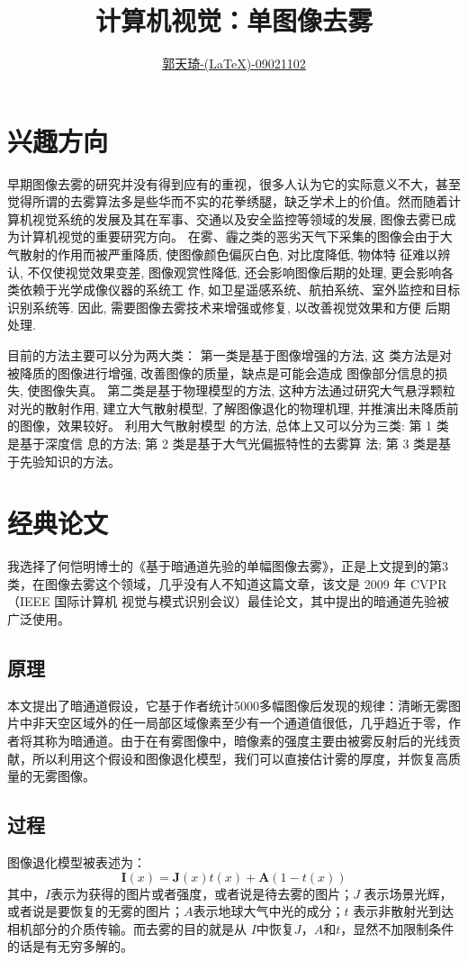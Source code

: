 \documentclass[conference]{IEEEtran}
\title{计算机视觉：单图像去雾}
\author{\underline{\underline{郭天琦-(\LaTeX{})-09021102}}}
\begin{document}
\maketitle
\section{兴趣方向}
早期图像去雾的研究并没有得到应有的重视，很多人认为它的实际意义不大，甚至觉得所谓的去雾算法多是些华而不实的花拳绣腿，缺乏学术上的价值。然而随着计算机视觉系统的发展及其在军事、交通以及安全监控等领域的发展, 图像去雾已成为计算机视觉的重要研究方向。 在雾、霾之类的恶劣天气下采集的图像会由于大气散射的作用而被严重降质, 使图像颜色偏灰白色, 对比度降低, 物体特
征难以辨认, 不仅使视觉效果变差, 图像观赏性降低, 还会影响图像后期的处理, 更会影响各类依赖于光学成像仪器的系统工
作, 如卫星遥感系统、航拍系统、室外监控和目标识别系统等. 因此, 需要图像去雾技术来增强或修复, 以改善视觉效果和方便
后期处理.\cite{吴迪2015图像去雾的最新研究进展}

目前的方法主要可以分为两大类：
第一类是基于图像增强的方法, 这
类方法是对被降质的图像进行增强, 改善图像的质量，缺点是可能会造成
图像部分信息的损失, 使图像失真。
第二类是基于物理模型的方法, 这种方法通过研究大气悬浮颗粒对光的散射作用, 建立大气散射模型, 了解图像退化的物理机理, 并推演出未降质前的图像，效果较好。
利用大气散射模型
的方法, 总体上又可以分为三类: 第 1 类是基于深度信
息的方法; 第 2 类是基于大气光偏振特性的去雾算
法; 第 3 类是基于先验知识的方法。
\section{经典论文}
我选择了何恺明博士的《基于暗通道先验的单幅图像去雾》，正是上文提到的第3类，在图像去雾这个领域，几乎没有人不知道这篇文章，该文是 2009 年 CVPR（IEEE 国际计算机
视觉与模式识别会议）最佳论文，其中提出的暗通道先验被广泛使用。
\subsection{原理}
本文提出了暗通道假设，它基于作者统计5000多幅图像后发现的规律：清晰无雾图片中非天空区域外的任一局部区域像素至少有一个通道值很低，几乎趋近于零，作者将其称为暗通道。由于在有雾图像中，暗像素的强度主要由被雾反射后的光线贡献，所以利用这个假设和图像退化模型，我们可以直接估计雾的厚度，并恢复高质量的无雾图像。
\subsection{过程}
图像退化模型被表述为：
\begin{equation}
    \mathbf{I}(x) = \mathbf{J}(x)t(x) + \mathbf{A}(1-t(x))
\end{equation}
其中，$I$表示为获得的图片或者强度，或者说是待去雾的图片；$J$ 表示场景光辉，或者说是要恢复的无雾的图片；$A$表示地球大气中光的成分；$t$ 表示非散射光到达相机部分的介质传输。而去雾的目的就是从 $I$中恢复$J$，$A$和$t$，显然不加限制条件的话是有无穷多解的。
\end{document}
